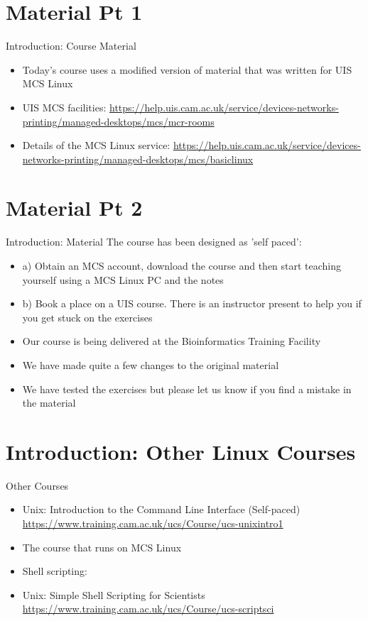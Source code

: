 \section{Material Pt 1}
\begin{frame}{Introduction: Course Material}
\begin{itemize}
\item Today's course uses a modified version of material that was written for UIS MCS Linux
\item UIS MCS facilities: \url{https://help.uis.cam.ac.uk/service/devices-networks-printing/managed-desktops/mcs/mcr-rooms} 
\item Details of the MCS Linux service: \url{https://help.uis.cam.ac.uk/service/devices-networks-printing/managed-desktops/mcs/basiclinux} 
\end{itemize}
\end{frame}

\section{Material Pt 2}
\begin{frame}{Introduction: Material}
The course has been designed as 'self paced':
\begin{itemize}
\item a) Obtain an MCS account, download the course and then start teaching yourself using a MCS Linux PC and the notes
\item b) Book a place on a UIS course. There is an instructor present to help you if you get stuck on the exercises
\item Our course is being delivered at the Bioinformatics Training Facility
\item We have made quite a few changes to the original material
\item We have tested the exercises but please let us know if you find a mistake in the material 
\end{itemize}
\end{frame}

\section{Introduction: Other Linux Courses}
\begin{frame}{Other Courses}
\begin{itemize}
\item Unix: Introduction to the Command Line Interface (Self-paced)
\small {\url{https://www.training.cam.ac.uk/ucs/Course/ucs-unixintro1}} 
\item{The course that runs on MCS Linux}
\pause
\item Shell scripting:
\item Unix: Simple Shell Scripting for Scientists
\small {\url{https://www.training.cam.ac.uk/ucs/Course/ucs-scriptsci}} 
\end{itemize}
\end{frame}

